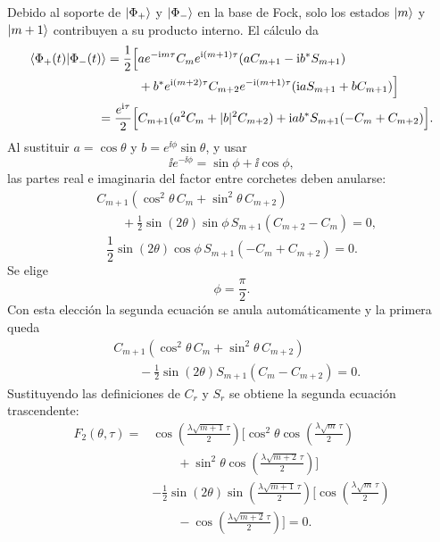Debido al soporte de $\ket{\Phi_+}$ y $\ket{\Phi_-}$ en la base de Fock,
solo los estados $\ket m$ y $\ket{m+1}$ contribuyen a su producto interno.
El c\'alculo da
\begin{equation}
\begin{aligned}
  \braket{\Phi_+(t)|\Phi_-(t)}
  =\frac12\Big[&
  a e^{-\mathrm{i} m\tau}C_m
  e^{\mathrm{i}(m+1)\tau}
  (aC_{m+1}-\mathrm{i} b^*S_{m+1})
  \\
  &+
  b^* e^{\mathrm{i}(m+2)\tau}C_{m+2}
  e^{-\mathrm{i}(m+1)\tau}
  (\mathrm{i} aS_{m+1}+bC_{m+1})
  \Big]
  \\
  =\frac{e^{\mathrm{i}\tau}}{2}\Big[&
  C_{m+1}(a^2C_m+|b|^2C_{m+2})
  +\mathrm{i} ab^*S_{m+1}(-C_m+C_{m+2})
  \Big].
\end{aligned}
\end{equation}
Al sustituir $a=\cos\theta$ y $b=e^{\ii\phi}\sin\theta$, y usar
\begin{equation}
  \ii e^{-\ii\phi}=\sin\phi+\ii\cos\phi,
\end{equation}
las partes real e imaginaria del factor entre corchetes deben anularse:
\begin{equation}
\begin{aligned}
  &C_{m+1}
  \left(
  \cos^2\theta\,C_m
  +\sin^2\theta\,C_{m+2}
  \right)
  \\
  &\qquad+
  \frac12\sin(2\theta)\sin\phi\,
  S_{m+1}(C_{m+2}-C_m)=0,
\end{aligned}
\end{equation}
\begin{equation}
  \frac12\sin(2\theta)\cos\phi\,
  S_{m+1}(-C_m+C_{m+2})=0.
\end{equation}
Se elige
\begin{equation}
  \phi=\frac{\pi}{2}.
\end{equation}
Con esta elecci\'on la segunda ecuaci\'on se anula autom\'aticamente y la
primera queda
\begin{equation}
\begin{aligned}
  &C_{m+1}
  \left(
  \cos^2\theta\,C_m
  +\sin^2\theta\,C_{m+2}
  \right)
  \\
  &\qquad-
  \frac12\sin(2\theta)S_{m+1}(C_m-C_{m+2})=0.
\end{aligned}
\end{equation}
Sustituyendo las definiciones de $C_r$ y $S_r$ se obtiene la segunda
ecuaci\'on trascendente:
\begin{equation}
  \boxed{
  \begin{aligned}
  F_2(\theta,\tau)
  ={}&
  \cos\left(\frac{\lambda\sqrt{m+1}\,\tau}{2}\right)
  \Bigg[
  \cos^2\theta
  \cos\left(\frac{\lambda\sqrt m\,\tau}{2}\right)
  \\
  &\qquad+
  \sin^2\theta
  \cos\left(\frac{\lambda\sqrt{m+2}\,\tau}{2}\right)
  \Bigg]
  \\
  &-
  \frac12\sin(2\theta)
  \sin\left(\frac{\lambda\sqrt{m+1}\,\tau}{2}\right)
  \Bigg[
  \cos\left(\frac{\lambda\sqrt m\,\tau}{2}\right)
  \\
  &\qquad-
  \cos\left(\frac{\lambda\sqrt{m+2}\,\tau}{2}\right)
  \Bigg]
  =0.
  \end{aligned}
  }
\end{equation}

